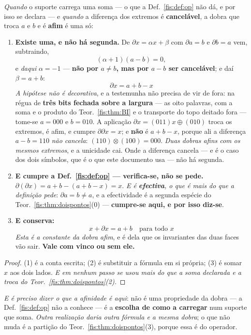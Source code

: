 \documentclass[livro.tex]{subfiles}
\begin{document}
\begin{teorema}\label{fis:thm:dobra}
\emph{Quando} o suporte carrega uma soma --- o que a Def.~\ref{fis:def:op} não
dá, e por isso se declara --- e \emph{quando} a diferença dos extremos é
\textbf{cancelável}, a dobra que troca $a$ e $b$ e é \textbf{afim} é uma só:
\begin{enumerate}\itemsep3pt
\item[(1)] \textbf{Existe uma, e não há segunda.} De $\partial x=\alpha x+\beta$
com $\partial a=b$ e $\partial b=a$ vem, subtraindo,
\[
(\alpha+1)(a-b)=0 ,
\]
e \emph{daqui} $\alpha=-1$ --- \textbf{não por $a\neq b$, mas por $a-b$ ser
cancelável}; e daí $\beta=a+b$:
\[
\boxed{\;\partial x=a+b-x\;}
\]
\emph{A hipótese não é decorativa}, e a testemunha não precisa de vir de fora:
na régua de \textbf{três bits fechada sobre a largura} --- as oito palavras, com
a soma e o produto do Teor.~\ref{fis:thm:BI} e o transporte do topo deitado
fora --- tome-se $a=000$ e $b=010$. A aplicação $\partial x=(011)x\oplus(010)$
troca os extremos, é afim, e cumpre $\partial\partial x=x$; e \textbf{não} é
$a+b-x$, porque ali a diferença $a-b=110$ \emph{não cancela}:
$(110)\otimes(100)=000$. \emph{Duas dobras afins com os mesmos extremos}, e a
unicidade cai. Onde a diferença cancela --- e é o caso dos dois símbolos, que é o
que este documento usa --- não há segunda.
\item[(2)] \textbf{E cumpre a Def.~\ref{fis:def:op} --- verifica-se, não se
pede.} $\partial(\partial x)=a+b-(a+b-x)=x$. \emph{E é \textbf{efectiva}, o que é
mais do que a definição pede}: $\partial a=b\neq a$, e a efectividade é a segunda
espécie do Teor.~\ref{fis:thm:doispontos}(0) --- \textbf{cumpre-se aqui, e por
isso diz-se}.
\item[(3)] \textbf{E conserva:}
\[
\boxed{\;x+\partial x=a+b\quad\text{para todo }x\;}
\]
\emph{Esta é a constante da dobra afim}, e é dela que os invariantes das duas
faces vão sair. \textbf{Vale com vinco ou sem ele.}
\end{enumerate}
\end{teorema}

\begin{proof}
(1) é a conta escrita; (2) é substituir a fórmula em si própria; (3) é somar $x$
aos dois lados. \emph{E em nenhum passo se usou mais do que a soma declarada e a
troca do Teor.~\ref{fis:thm:doispontos}(2).}
\end{proof}

\medskip\noindent\emph{E é preciso dizer o que a afinidade é aqui}: não é uma
propriedade da dobra --- a Def.~\ref{fis:def:op} não a conhece --- é a
\textbf{escolha de como a carregar} num suporte que soma. \emph{Outra realização
daria outra fórmula e a mesma dobra}; o que não muda é a partição do
Teor.~\ref{fis:thm:doispontos}(3), porque essa é do operador.
\end{document}
